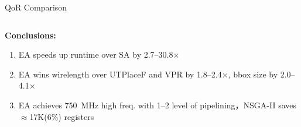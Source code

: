 \documentclass[10pt]{beamer}
\begin{document}
\begin{frame}{QoR Comparison}
\begin{columns}[T, onlytextwidth]
  \end{columns}



  {\fontsize{8}{12}\selectfont

  {\bf Conclusions:}\\
  \begin{enumerate}
    \item EA speeds up runtime over SA by \alert{2.7--30.8$\times$}
    \item EA wins wirelength over UTPlaceF and VPR by \alert{1.8--2.4$\times$}, bbox size by \alert{2.0--4.1$\times$}
    \item EA achieves 750~MHz high freq. with 1--2 level of pipelining，NSGA-II saves $\approx$17K(6\%) registers
  \end{enumerate}
  }





\end{frame}
\end{document}

